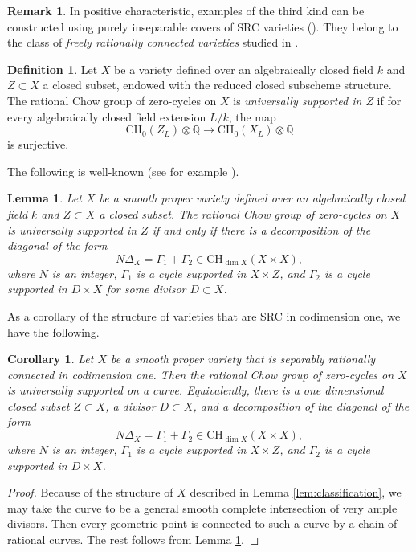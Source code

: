 \documentclass{amsart}
\newtheorem{cor}[theorem]{Corollary}
\newtheorem{lem}[theorem]{Lemma}
\theoremstyle{definition}
\newtheorem{defn}[theorem]{Definition}
\newtheorem{rem}[theorem]{Remark}
\theoremstyle{remark}
\newcommand{\mbb}{\mathbb}
\newcommand{\QQ}{\mbb{Q}}
\begin{document}
\begin{rem}
    In positive characteristic, examples of the third kind can be constructed using purely inseparable covers of SRC varieties (\cite[Example V.5.19]{Kollar96}). They belong to the class of \emph{freely rationally connected varieties} studied in \cite{ShenFRC}.
\end{rem}

\begin{defn}
    Let $X$ be a variety defined over an algebraically closed field $k$ and $Z \subset X$ a closed subset, endowed with the reduced closed subscheme structure. The rational Chow group of zero-cycles on $X$ is \emph{universally supported in $Z$} if for every algebraically closed field extension $L/k$, the map
    \[
    \text{CH}_0(Z_L)\otimes \QQ \to \text{CH}_0(X_L)\otimes \QQ
    \]
    is surjective.
\end{defn}
The following is well-known (see for example \cite[Proposition 1]{BlochSrinivas}).
\begin{lem}\label{lem:dd}
    Let $X$ be a smooth proper variety defined over an algebraically closed field $k$ and $Z \subset X$ a closed subset. The rational Chow group of zero-cycles on $X$ is universally supported in $Z$ if and only if there is a decomposition of the diagonal of the form
    \[
    N \Delta_X=\Gamma_1+\Gamma_2 \in \text{CH}_{\dim X}(X \times X),
    \]
    where $N$ is an integer, $\Gamma_1$ is a cycle supported in $X \times Z$, and $\Gamma_2$ is a cycle supported in $D\times X$ for some divisor $D \subset X$.
\end{lem}
As a corollary of the structure of varieties that are SRC in codimension one, we have the following.
\begin{cor}\label{rem:support}
    Let $X$ be a smooth proper variety that is separably rationally connected in codimension one. Then the rational Chow group of zero-cycles on $X$ is universally supported on a curve.
    Equivalently, there is a one dimensional closed subset $Z\subset X$, a divisor $D \subset X$, and a decomposition of the diagonal of the form
    \[
    N \Delta_X=\Gamma_1+\Gamma_2 \in \text{CH}_{\dim X}(X \times X),
    \]
    where $N$ is an integer, $\Gamma_1$ is a cycle supported in $X \times Z$, and $\Gamma_2$ is a cycle supported in $D\times X$. 
\end{cor}
\begin{proof}
    Because of the structure of $X$ described in Lemma \ref{lem:classification}, we may take the curve to be a general smooth complete intersection of very ample divisors. Then every geometric point is connected to such a curve by a chain of rational curves. The rest follows from Lemma \ref{lem:dd}.
\end{proof}
\end{document}
